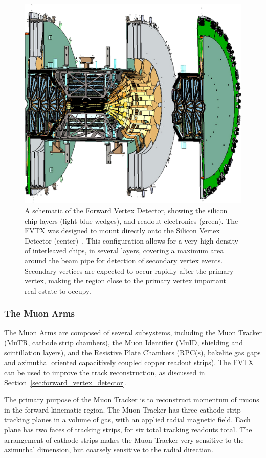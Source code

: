 \begin{figure}[ht]
  \centering
  \includegraphics[width=0.6\linewidth]{./figures/forward_vertex_detector}
  \caption{
    A schematic of the Forward Vertex Detector, showing the silicon chip layers
    (light blue wedges), and readout electronics (green). The FVTX was designed
    to mount directly onto the Silicon Vertex Detector
    (center)~\cite{Aidala2014}.  This configuration allows for a very high
    density of interleaved chips, in several layers, covering a maximum area
    around the beam pipe for detection of secondary vertex events. Secondary
    vertices are expected to occur rapidly after the primary vertex, making the
    region close to the primary vertex important real-estate to occupy.
  } 
  \label{fig:forward_vertex_detector}
\end{figure}

\clearpage
\subsubsection{The Muon Arms}

The Muon Arms are composed of several subsystems, including the Muon Tracker
(MuTR, cathode strip chambers), the Muon Identifier (MuID, shielding and
scintillation layers), and the Resistive Plate Chambers (RPC(s), bakelite gas
gaps and azimuthal oriented capacitively coupled copper readout strips). The
FVTX can be used to improve the track reconstruction, as discussed in
Section~\ref{sec:forward_vertex_detector}. 

The primary purpose of the Muon Tracker is to reconstruct momentum of muons in
the forward kinematic region.  The Muon Tracker has three cathode strip tracking
planes in a volume of gas, with an applied radial magnetic field.  Each plane
has two faces of tracking strips, for six total tracking readouts total. The
arrangement of cathode strips  makes the Muon Tracker very sensitive to the
azimuthal dimension, but coarsely sensitive to the radial direction. 

